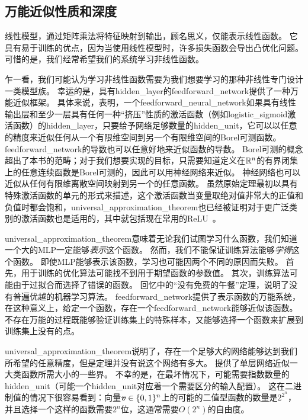 \subsection{万能近似性质和深度}
\label{sec:universal_approximation_properties_and_depth}

线性模型，通过矩阵乘法将特征映射到输出，顾名思义，仅能表示线性函数。
它具有易于训练的优点，因为当使用线性模型时，许多损失函数会导出凸优化问题。
可惜的是，我们经常希望我们的系统学习非线性函数。

乍一看，我们可能认为学习非线性函数需要为我们想要学习的那种非线性专门设计一类模型族。
幸运的是，具有\gls{hidden_layer}的\gls{feedforward_network}提供了一种万能近似框架。
具体来说，\citep{Hornik89,Cybenko89}表明，一个\gls{feedforward_neural_network}如果具有线性输出层和至少一层具有任何一种``挤压''性质的激活函数（例如\gls{logistic_sigmoid}激活函数）的\gls{hidden_layer}，只要给予网络足够数量的\gls{hidden_unit}，它可以以任意的精度来近似任何从一个有限维空间到另一个有限维空间的Borel可测函数。
\gls{feedforward_network}的导数也可以任意好地来近似函数的导数\citep{hornik1990universal}。
Borel可测的概念超出了本书的范畴；对于我们想要实现的目标，只需要知道定义在$\mathbb{R}^n$的有界闭集上的任意连续函数是Borel可测的，因此可以用神经网络来近似。
神经网络也可以近似从任何有限维离散空间映射到另一个的任意函数。
虽然原始定理最初以具有特殊激活函数的单元的形式来描述，这个激活函数当变量取绝对值非常大的正值和负值时都会饱和，\gls{universal_approximation_theorem}也已经被证明对于更广泛类别的激活函数也是适用的，其中就包括现在常用的\gls{ReLU}~\citep{Leshno-et-al-1993}。


\gls{universal_approximation_theorem}意味着无论我们试图学习什么函数，我们知道一个大的MLP一定能够\emph{表示}这个函数。
然而，我们不能保证训练算法能够\emph{学得}这个函数。
即使MLP能够表示该函数，学习也可能因两个不同的原因而失败。
首先，用于训练的优化算法可能找不到用于期望函数的参数值。
其次，训练算法可能由于过拟合而选择了错误的函数。
回忆中的``没有免费的午餐''定理，说明了没有普遍优越的机器学习算法。
\gls{feedforward_network}提供了表示函数的万能系统，在这种意义上，给定一个函数，存在一个\gls{feedforward_network}能够近似该函数。
不存在万能的过程既能够验证训练集上的特殊样本，又能够选择一个函数来扩展到训练集上没有的点。

\gls{universal_approximation_theorem}说明了，存在一个足够大的网络能够达到我们所希望的任意精度，但是定理并没有说这个网络有多大。
\cite{Barron93}提供了单层网络近似一大类函数所需大小的一些界。
不幸的是，在最坏情况下，可能需要指数数量的\gls{hidden_unit}（可能一个\gls{hidden_unit}对应着一个需要区分的输入配置）。
这在二进制值的情况下很容易看到：向量$\boldsymbol{\mathit{v}} \in \{0,1\}^n$上的可能的二值型函数的数量是$2^{2^n}$，并且选择一个这样的函数需要$2^n$位，这通常需要$O(2^n)$的自由度。

